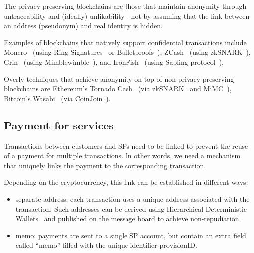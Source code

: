 \documentclass[pdftex,twocolumn,epjc3]{svjour3}
\begin{document}
{\begin{figure}[h!]
\label{fig:anonymity-diagram}
\end{figure}
The privacy-preserving blockchains are those that maintain anonymity through untraceability and (ideally) unlikability - not by assuming that the link between an address (pseudonym) and real identity is hidden.   

Examples of blockchains that natively support confidential transactions include Monero~\cite{vansaberhagenCryptoNote2013} (using Ring Signatures~\cite{noetherRingSignatureConfidential2015} or Bulletproofs~\cite{bunzBulletproofsShortProofs2018}), ZCash~\cite{ben-sassonZerocashDecentralizedAnonymous2014} (using zkSNARK~\cite{ben-sassonSNARKsVerifyingProgram2013}), Grin~\cite{fuchsbauerAggregateCashSystems2019} (using Mimblewimble~\cite{jedusorMIMBLEWIMBLE2016}), and IronFish~\cite{ironfishPrivateAnonymousEasy} (using Sapling protocol~\cite{hopwoodZcashSaplingProtocol2022}).

Overly techniques that achieve anonymity on top of non-privacy preserving blockchains are Ethereum's Tornado Cash~\cite{pertsevTornadoCashPrivacy2019} (via zkSNARK~\cite{grothSizePairingbasedNoninteractive2016} and MiMC~\cite{albrechtMiMCEfficientEncryption2016}), Bitcoin's Wasabi~\cite{wasabiwalletBitcoinPrivacyWallet} (via CoinJoin~\cite{maxwellCoinJoinBitcoinPrivacy2013}).

\subsection{Payment for services}\label{payment-for-services}
Transactions between customers and SPs need to be linked to prevent the reuse of a payment for multiple transactions. In other words, we need a mechanism that uniquely links the payment to the corresponding transaction.

Depending on the cryptocurrency, this link can be established in different ways:

\begin{itemize}
\item separate address: each transaction uses a unique address associated with the transaction. Such addresses can be derived using Hierarchical Deterministic Wallets~\cite{wuilleBIP32HierarchicalDeterministic2012} and published on the message board to achieve non-repudiation.
\item memo: payments are sent to a single SP account, but contain an extra field called ``memo'' filled with the unique identifier $\textrm{provisionID}$. 
\end{itemize}

}
\end{document}
